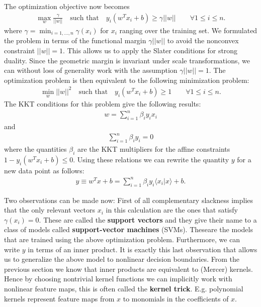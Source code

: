 {    The optimization objective now becomes
    \begin{gather}
        \max_w \frac{\gamma}{||w||}\quad\text{such that}\quad y_i(w^Tx_i+b)\geq\gamma||w||\qquad\forall 1\leq i\leq n.
    \end{gather}
    where $\gamma=\min_{i=1,\ldots,n}\gamma(x_i)$ for $x_i$ ranging over the training set. We formulated the problem in terms of the functional margin $\gamma||w||$ to avoid the nonconvex constraint $||w||=1$. This allows us to apply the Slater conditions for strong duality. Since the geometric margin is invariant under scale transformations, we can without loss of generality work with the assumption $\gamma||w|| = 1$. The optimization problem is then equivalent to the following minimization problem:
    \begin{gather}
        \min_w ||w||^2\quad\text{such that}\quad y_i(w^Tx_i+b)\geq1\qquad\forall 1\leq i\leq n.
    \end{gather}
    The KKT conditions for this problem give the following results:
    \begin{gather}
        w = \sum_{i=1}^n\beta_iy_ix_i
    \end{gather}
    and
    \begin{gather}
        \sum_{i=1}^n\beta_iy_i = 0
    \end{gather}
    where the quantities $\beta_i$ are the KKT multipliers for the affine constraints $1-y_i(w^Tx_i+b)\leq0$. Using these relations we can rewrite the quantity $y$ for a new data point as follows:
    \begin{gather}
        y \equiv w^Tx + b = \sum_{i=1}^n\beta_iy_i\langle x_i|x \rangle + b.
    \end{gather}

    Two observations can be made now: First of all complementary slackness implies that the only relevant vectors $x_i$ in this calculation are the ones that satisfy $\gamma(x_i)=0$. These are called the \textbf{support vectors} and they give their name to a class of models called \textbf{support-vector machines} (SVMs). Theseare the models that are trained using the above optimization problem. Furthermore, we can write $y$ in terms of an inner product. It is exactly this last observation that allows us to generalize the above model to nonlinear decision boundaries. From the previous section we know that inner products are equivalent to (Mercer) kernels. Hence by choosing nontrivial kernel functions we can implicitly work with nonlinear feature maps, this is often called the \textbf{kernel trick}. E.g. polynomial kernels represent feature maps from $x$ to monomials in the coefficients of $x$.

}
